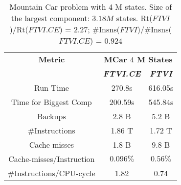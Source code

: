 \documentclass[conference]{IEEEtran}
\begin{document}
\begin{table}[h!]
\caption{Mountain Car problem with 4 M states. Size of the largest component: $3.18 M$ states. Rt($FTVI$)/Rt($FTVI.CE$) = $2.27$; \#Insns($FTVI$)/\#Insns($FTVI.CE$) = $0.924$}
\vskip 0.18in
\begin{center}
\begin{small}
\begin{sc}
\begin{tabular}{|c|c|c|}
\hline
\textbf{Metric}&\multicolumn{2}{|c|}{\textbf{MCar $4$ M States}} \\
\cline{2-3} 
\textbf{} & \textbf{\textit{FTVI.CE}} & \textbf{\textit{FTVI}} \\
\hline
Run Time & 270.8s & 616.05s \\
\hline
Time for Biggest Comp & 200.59s & 545.84s \\
\hline
Backups & 2.8 B & 5.2 B \\
\hline
\#Instructions & 1.86 T & 1.72 T \\
\hline
Cache-misses &1.8 B & 9.8 B \\
\hline 
Cache-misses/Instruction & $0.096\%$ & $0.56\%$ \\
\hline
\#Instructions/CPU-cycle & 1.82 & 0.74 \\
\hline
\end{tabular}
\label{tab2}
\end{sc}
\end{small}
\end{center}
\vskip -0.1in
\end{table}
\end{document}
